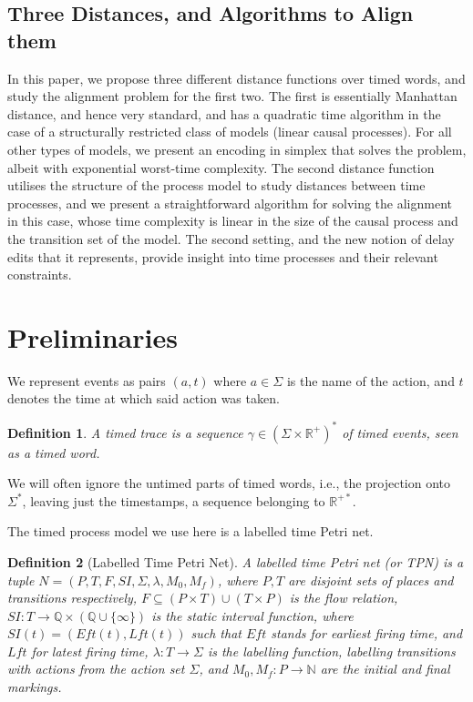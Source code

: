 \documentclass[conference]{IEEEtran}
\newtheorem{definition}{Definition}
\begin{document}
	\subsection{Three Distances, and Algorithms to Align them}
	
	In this paper, we propose three different distance functions over timed words, and study the alignment problem for the first two. 
	The first is essentially Manhattan distance, and hence very standard, and has a quadratic time algorithm in the case of a structurally restricted class of models (linear causal processes).
	For all other types of models, we present an encoding in simplex that solves the problem, albeit with exponential worst-time complexity.
	The second distance function utilises the structure of the process model to study distances between time processes, and we present a straightforward algorithm for solving the alignment in this case, whose time complexity is linear in the size of the causal process and the transition set of the model. The second setting, and the new notion of delay edits that it represents, provide insight into time processes and their relevant constraints. 
	
	\section{Preliminaries}
	We represent events as pairs $(a,t)$ where $a \in \Sigma$ is the name of the action, and $t$ denotes the time at which said action was taken.
	
	\begin{definition}
		A timed trace is a sequence $\gamma \in (\Sigma \times \mathbb{R}^+)^*$ of timed events, seen as a timed word. 
	\end{definition}
	
	We will often ignore the untimed parts of timed words, i.e., the projection onto $\Sigma^*$, leaving just the timestamps, a sequence belonging to $\mathbb{R}^{+*}$. 
	
	The timed process model we use here is a labelled time Petri net. 
	
	\begin{definition}[Labelled Time Petri Net] \label{tpn} A labelled \textit{time Petri net} (or TPN) is a tuple $N = (P, T, F, SI, \Sigma, \lambda, M_0, M_f)$, where $P, T$ are disjoint sets of places and transitions respectively,  $F \subseteq (P \times T) \cup (T \times P)$ is the flow relation,  $SI : T \rightarrow \mathbb{Q} \times (\mathbb{Q} \cup \{\infty\})$ is the static interval function, where $SI(t) = (Eft(t), Lft(t))$ such that $Eft$ stands for earliest firing time, and $Lft$ for latest firing time, $\lambda : T \rightarrow \Sigma$ is the labelling function, labelling transitions with actions from the action set $\Sigma$, and  $ M_0 , M_f: P \to \mathbb{N}$ are the initial and final markings. %
	\end{definition}
	
\end{document}

